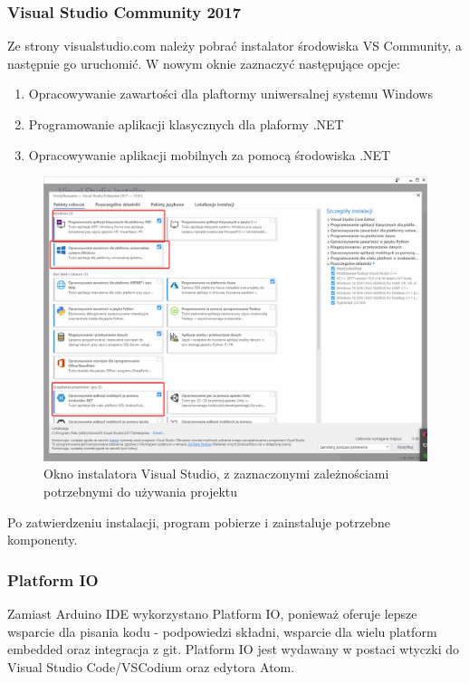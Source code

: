 \documentclass{report}
\begin{document}
        \subsubsection{Visual Studio Community 2017}
        Ze strony visualstudio.com należy pobrać instalator środowiska VS Community, a następnie go uruchomić. W nowym oknie zaznaczyć następujące opcje:
        \begin{enumerate}
            \item Opracowywanie zawartości dla plaftormy uniwersalnej systemu Windows
            \item Programowanie aplikacji klasycznych dla plaformy .NET
            \item Opracowywanie aplikacji mobilnych za pomocą środowiska .NET
        \end{enumerate}
    	\begin{figure}[H]
    		\centering
    		\includegraphics[scale=0.3]{visual_1.png}
    		\caption{Okno instalatora Visual Studio, z zaznaczonymi zależnościami potrzebnymi do używania projektu}
    	\end{figure}
        Po zatwierdzeniu instalacji, program pobierze i zainstaluje potrzebne komponenty.
        \subsubsection{Platform IO}
		Zamiast Arduino IDE wykorzystano Platform IO, ponieważ oferuje lepsze wsparcie dla pisania kodu - podpowiedzi składni, wsparcie dla wielu platform embedded oraz integracja z git. Platform IO jest wydawany w postaci wtyczki do Visual Studio Code/VSCodium oraz edytora Atom. 
		
\end{document}
